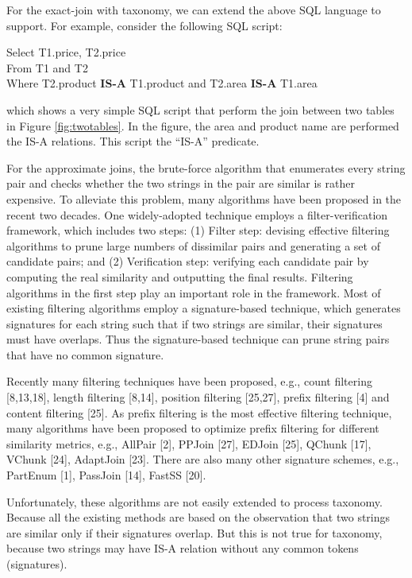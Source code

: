 For the exact-join with taxonomy, we can extend the above SQL language to support. For example,
consider the following SQL script:

\vspace{2mm}

\noindent \textsf{Select T1.price, T2.price} \\
\noindent \textsf{ From T1 and T2} \\
\noindent   \textsf{Where T2.product \textbf{IS-A} T1.product and T2.area \textbf{IS-A} T1.area}

 \vspace{2mm}


\noindent which shows a very simple SQL script that
perform the join between two tables in Figure \ref{fig:twotables}.
In the figure, the area and product name are performed the IS-A relations. This script the ``IS-A'' predicate.


For the approximate joins, the brute-force algorithm that enumerates every string pair and checks whether the two strings in the pair are similar is rather expensive. To alleviate this problem, many algorithms have been proposed in the recent two decades. One widely-adopted technique employs a filter-verification framework, which includes two steps: (1) Filter step: devising effective filtering algorithms to prune large numbers of dissimilar pairs and generating a set of candidate pairs; and (2) Verification step: verifying each candidate pair by computing
the real similarity and outputting the final results. Filtering algorithms in the first step play an important role
in the framework. Most of existing filtering algorithms employ a signature-based technique, which generates signatures for each string such that if two strings are similar, their signatures must have overlaps. Thus the signature-based technique can prune string pairs that have no common signature.

Recently many filtering techniques have been proposed, e.g., count filtering [8,13,18], length filtering [8,14], position
filtering [25,27], prefix filtering [4] and content filtering [25]. As prefix filtering is the most effective filtering technique,
many algorithms have been proposed to optimize prefix filtering for different similarity metrics, e.g., AllPair [2],
PPJoin [27], EDJoin [25], QChunk [17], VChunk [24], AdaptJoin [23]. There are also many other signature schemes, e.g., PartEnum [1],
PassJoin [14], FastSS [20].

Unfortunately, these algorithms are not easily extended to process taxonomy. Because all the existing methods are based on the observation that two strings are similar only if their signatures overlap. But this is not true for taxonomy, because two strings may have IS-A relation without any common tokens (signatures).

